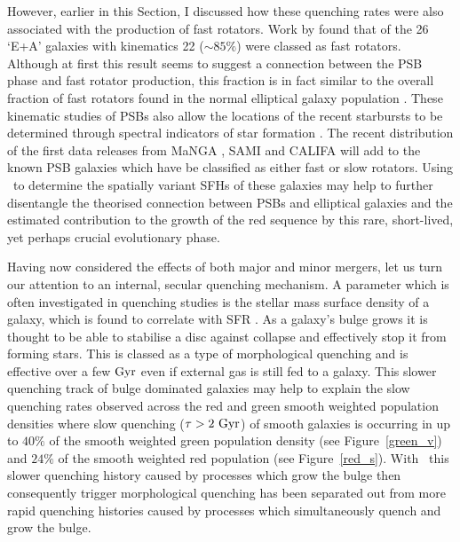 However, earlier in this Section, I discussed how these quenching rates were also associated with the production of fast rotators. Work by \citep{pracy13} found that of the 26 `E+A' galaxies with kinematics 22 ($\sim85\%$) were classed as fast rotators. Although at first this result seems to suggest a connection between the PSB phase and fast rotator production, this fraction is in fact similar to the overall fraction of fast rotators found in the normal elliptical galaxy population \citep{emsellem11, stott16}. These kinematic studies of PSBs also allow the locations of the recent starbursts to be determined through spectral indicators of star formation \citep[such as $H\alpha$;][]{kennicutt94}. The recent distribution of the first data releases from MaNGA \citep[SDSS DR13;][]{albareti16}, SAMI \citep[EDR;][]{allen15} and CALIFA \citep[DR3;][]{sanchez16} will add to the known PSB galaxies which have be classified as either fast or slow rotators. Using \starpy\ to determine the spatially variant SFHs of these galaxies may help to further disentangle the theorised connection between PSBs and elliptical galaxies and the estimated contribution to the growth of the red sequence by this rare, short-lived, yet perhaps crucial evolutionary phase. 

Having now considered the effects of both major and minor mergers, let us turn our attention to an internal, secular quenching mechanism. A parameter which is often investigated in quenching studies is the stellar mass surface density of a galaxy, which is found to correlate with SFR \citep{barro13b, whitaker16}. As a galaxy's bulge grows it is thought to be able to stabilise a disc against collapse and effectively stop it from forming stars. This is classed as a type of morphological quenching and is effective over a few $\rm{Gyr}$ \citep{Fang13} even if external gas is still fed to a galaxy. This slower quenching track of bulge dominated galaxies may help to explain the slow quenching rates observed across the red and green smooth weighted population densities where slow quenching ($\tau>2~\rm{Gyr}$) of smooth galaxies is occurring in up to $40\%$ of the smooth weighted green population density (see Figure~\ref{green_v}) and $24\%$ of the smooth weighted red population (see Figure~\ref{red_s}). With \starpy\ this slower quenching history caused by processes which grow the bulge then consequently trigger morphological quenching has been separated out from more rapid quenching histories caused by processes which simultaneously quench and grow the bulge. 


